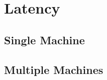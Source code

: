 \section{Latency}
\subsection{Single Machine}
\label{Riado_Lyaer_RL}


\subsection{Multiple Machines}
\label{Riado_Lyaer_RL}